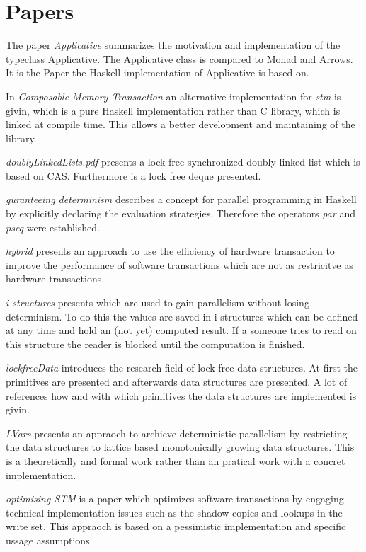 \documentclass[a4paper,10pt]{article}
\begin{document}
\section{Papers}
The paper \textit{Applicative} summarizes the motivation and implementation of the typeclass Applicative. The Applicative class is compared to
Monad and Arrows. It is the Paper the Haskell implementation of Applicative is based on.

In \textit{Composable Memory Transaction} an alternative implementation for \textit{stm} is givin, which is a pure
Haskell implementation rather than C library, which is linked at compile time. This allows a better development and
maintaining of the library.

\textit{doublyLinkedLists.pdf} presents a lock free synchronized doubly linked list which is based on CAS. Furthermore
is  a lock free deque presented.

\textit{guranteeing determinism} describes a concept for parallel programming in Haskell by explicitly declaring
the evaluation strategies. Therefore the operators \textit{par} and \textit{pseq} were established.

\textit{hybrid} presents an approach to use the efficiency of hardware transaction to improve the performance
of software transactions which are not as restricitve as hardware transactions.

\textit{i-structures} presents which are used to gain parallelism without losing determinism. To do this 
the values are saved in i-structures which can be defined at any time and hold an (not yet) computed result.
If a someone tries to read on this structure the reader is blocked until the computation is finished.

\textit{lockfreeData} introduces the research field of lock free data structures. At first the primitives are 
presented and afterwards data structures are presented. A lot of references how and with which primitives the data 
structures are implemented is givin.

\textit{LVars} presents an appraoch to archieve deterministic parallelism by restricting the data structures to
lattice based monotonically growing data structures. This is a theoretically and formal work rather than an 
pratical work with a concret implementation.

\textit{optimising STM} is a paper which optimizes software transactions by engaging technical implementation issues 
such as the shadow copies and lookups in the write set. This appraoch is based on a pessimistic implementation and 
specific ussage assumptions.
\end{document}
